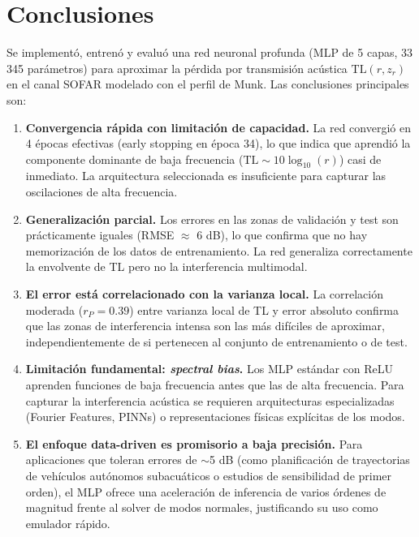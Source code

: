 \documentclass[12pt,a4paper]{article}
\newcommand{\TL}{\mathrm{TL}}
\begin{document}
\section{Conclusiones}

Se implementó, entrenó y evaluó una red neuronal profunda (MLP de 5 capas,
33\,345 parámetros) para aproximar la pérdida por transmisión acústica
$\TL(r,z_r)$ en el canal SOFAR modelado con el perfil de Munk.
Las conclusiones principales son:

\begin{enumerate}
  \item \textbf{Convergencia rápida con limitación de capacidad.}
        La red convergió en 4 épocas efectivas (early stopping en época 34),
        lo que indica que aprendió la componente dominante de baja frecuencia
        ($\TL \sim 10\log_{10}(r)$) casi de inmediato. La arquitectura
        seleccionada es insuficiente para capturar las oscilaciones de alta
        frecuencia.

  \item \textbf{Generalización parcial.}
        Los errores en las zonas de validación y test son prácticamente
        iguales (RMSE $\approx$ 6 dB), lo que confirma que no hay memorización
        de los datos de entrenamiento. La red generaliza correctamente la
        envolvente de TL pero no la interferencia multimodal.

  \item \textbf{El error está correlacionado con la varianza local.}
        La correlación moderada ($r_P = 0.39$) entre varianza local de TL y
        error absoluto confirma que las zonas de interferencia intensa son las
        más difíciles de aproximar, independientemente de si pertenecen al
        conjunto de entrenamiento o de test.

  \item \textbf{Limitación fundamental: \emph{spectral bias}.}
        Los MLP estándar con ReLU aprenden funciones de baja frecuencia antes
        que las de alta frecuencia. Para capturar la interferencia acústica se
        requieren arquitecturas especializadas (Fourier Features, PINNs) o
        representaciones físicas explícitas de los modos.

  \item \textbf{El enfoque data-driven es promisorio a baja precisión.}
        Para aplicaciones que toleran errores de $\sim$5 dB (como planificación
        de trayectorias de vehículos autónomos subacuáticos o estudios de
        sensibilidad de primer orden), el MLP ofrece una aceleración de
        inferencia de varios órdenes de magnitud frente al solver de modos
        normales, justificando su uso como emulador rápido.
\end{enumerate}
\end{document}
